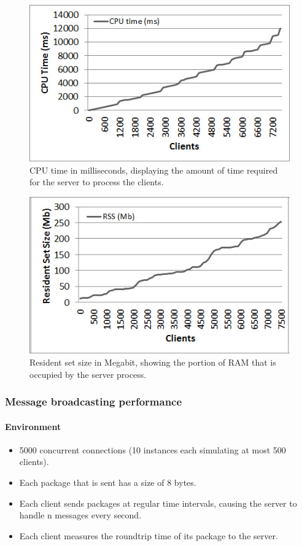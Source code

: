 \documentclass[12pt]{article}
\begin{document}
\begin{center}
\begin{figure}
\includegraphics[scale=0.75]{test_CLIENT_CPUtime.jpg}
\caption{CPU time in milliseconds, displaying the amount of time required for the server to process the clients.}
\end{figure}


\begin{figure}
\includegraphics[scale=0.75]{test_CLIENT_RSS.jpg}
\caption{Resident set size in Megabit, showing the portion of RAM that is occupied by the server process.}
\end{figure}

\end{center}


\subsubsection{Message broadcasting performance}
\paragraph{Environment}
\begin{itemize}
\item 5000 concurrent connections (10 instances each simulating at most 500 clients).
\item Each package that is sent has a size of 8 bytes.
\item Each client sends packages at regular time intervals, causing the server to handle n messages every second.
\item Each client measures the roundtrip time of its package to the server.
\end{itemize}
\end{document}
